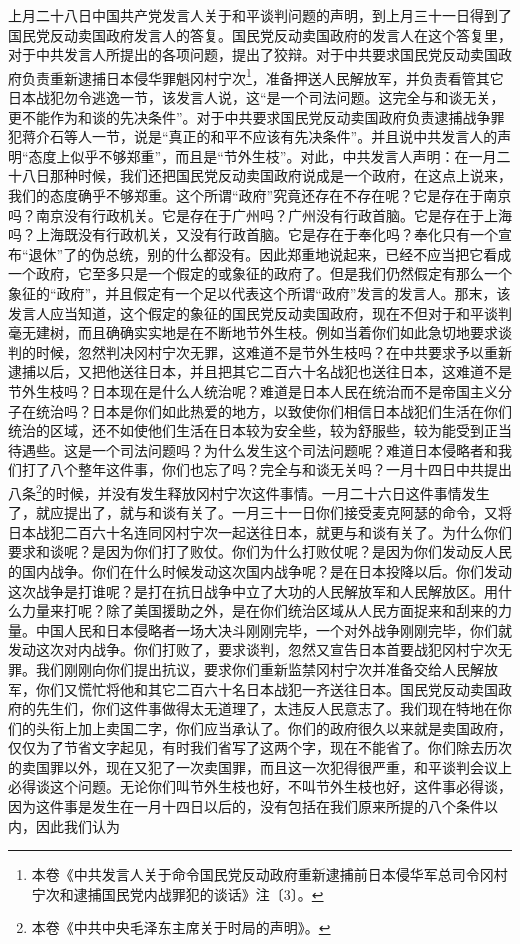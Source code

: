\documentclass[cn,11pt,chinese]{elegantbook}
\begin{document}
上月二十八日中国共产党发言人关于和平谈判问题的声明，到上月三十一日得到了国民党反动卖国政府发言人的答复。国民党反动卖国政府的发言人在这个答复里，对于中共发言人所提出的各项问题，提出了狡辩。对于中共要求国民党反动卖国政府负责重新逮捕日本侵华罪魁冈村宁次\footnote[1]{本卷《中共发言人关于命令国民党反动政府重新逮捕前日本侵华军总司令冈村宁次和逮捕国民党内战罪犯的谈话》注〔3〕。}，准备押送人民解放军，并负责看管其它日本战犯勿令逃逸一节，该发言人说，这“是一个司法问题。这完全与和谈无关，更不能作为和谈的先决条件”。对于中共要求国民党反动卖国政府负责逮捕战争罪犯蒋介石等人一节，说是“真正的和平不应该有先决条件”。并且说中共发言人的声明“态度上似乎不够郑重”，而且是“节外生枝”。对此，中共发言人声明：在一月二十八日那种时候，我们还把国民党反动卖国政府说成是一个政府，在这点上说来，我们的态度确乎不够郑重。这个所谓“政府”究竟还存在不存在呢？它是存在于南京吗？南京没有行政机关。它是存在于广州吗？广州没有行政首脑。它是存在于上海吗？上海既没有行政机关，又没有行政首脑。它是存在于奉化吗？奉化只有一个宣布“退休”了的伪总统，别的什么都没有。因此郑重地说起来，已经不应当把它看成一个政府，它至多只是一个假定的或象征的政府了。但是我们仍然假定有那么一个象征的“政府”，并且假定有一个足以代表这个所谓“政府”发言的发言人。那末，该发言人应当知道，这个假定的象征的国民党反动卖国政府，现在不但对于和平谈判毫无建树，而且确确实实地是在不断地节外生枝。例如当着你们如此急切地要求谈判的时候，忽然判决冈村宁次无罪，这难道不是节外生枝吗？在中共要求予以重新逮捕以后，又把他送往日本，并且把其它二百六十名战犯也送往日本，这难道不是节外生枝吗？日本现在是什么人统治呢？难道是日本人民在统治而不是帝国主义分子在统治吗？日本是你们如此热爱的地方，以致使你们相信日本战犯们生活在你们统治的区域，还不如使他们生活在日本较为安全些，较为舒服些，较为能受到正当待遇些。这是一个司法问题吗？为什么发生这个司法问题呢？难道日本侵略者和我们打了八个整年这件事，你们也忘了吗？完全与和谈无关吗？一月十四日中共提出八条\footnote[2]{本卷《中共中央毛泽东主席关于时局的声明》。}的时候，并没有发生释放冈村宁次这件事情。一月二十六日这件事情发生了，就应提出了，就与和谈有关了。一月三十一日你们接受麦克阿瑟的命令，又将日本战犯二百六十名连同冈村宁次一起送往日本，就更与和谈有关了。为什么你们要求和谈呢？是因为你们打了败仗。你们为什么打败仗呢？是因为你们发动反人民的国内战争。你们在什么时候发动这次国内战争呢？是在日本投降以后。你们发动这次战争是打谁呢？是打在抗日战争中立了大功的人民解放军和人民解放区。用什么力量来打呢？除了美国援助之外，是在你们统治区域从人民方面捉来和刮来的力量。中国人民和日本侵略者一场大决斗刚刚完毕，一个对外战争刚刚完毕，你们就发动这次对内战争。你们打败了，要求谈判，忽然又宣告日本首要战犯冈村宁次无罪。我们刚刚向你们提出抗议，要求你们重新监禁冈村宁次并准备交给人民解放军，你们又慌忙将他和其它二百六十名日本战犯一齐送往日本。国民党反动卖国政府的先生们，你们这件事做得太无道理了，太违反人民意志了。我们现在特地在你们的头衔上加上卖国二字，你们应当承认了。你们的政府很久以来就是卖国政府，仅仅为了节省文字起见，有时我们省写了这两个字，现在不能省了。你们除去历次的卖国罪以外，现在又犯了一次卖国罪，而且这一次犯得很严重，和平谈判会议上必得谈这个问题。无论你们叫节外生枝也好，不叫节外生枝也好，这件事必得谈，因为这件事是发生在一月十四日以后的，没有包括在我们原来所提的八个条件以内，因此我们认为
\end{document}

